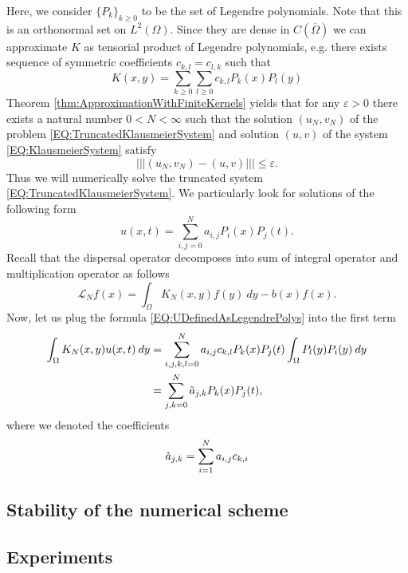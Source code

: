 \documentclass[12pt, a4paper]{article}
\theoremstyle{break}
\theoremstyle{break}
\theoremstyle{break}
\theoremstyle{break}
\theoremstyle{break}
\theoremstyle{break}
\theoremstyle{break}
\begin{document}
Here, we consider $\{ P_k \}_{k \geq 0}$ to be the set of Legendre polynomials. Note that this is an orthonormal set on $L^2(\Omega)$. Since they are dense in $C(\overline{\Omega})$ we can approximate $K$ as tensorial product of Legendre polynomials, e.g. there exists sequence of symmetric coefficients $c_{k,l} = c_{l, k}$ such that
\begin{equation}
    K(x, y) = \sum_{k \geq 0} \sum_{l \geq 0} c_{k, l} P_k(x) P_l(y)
\end{equation}
Theorem \ref{thm:ApproximationWithFiniteKernels} yields that for any $\varepsilon > 0$ there exists a natural number $0 < N < \infty$ such that the solution $(u_N, v_N)$ of the problem \eqref{EQ:TruncatedKlausmeierSystem} and solution $(u, v)$ of the system \eqref{EQ:KlausmeierSystem} satisfy
\begin{equation}
    |||(u_N, v_N) - (u, v)||| \leq \varepsilon.
\end{equation}
Thus we will numerically solve the truncated system \eqref{EQ:TruncatedKlausmeierSystem}. We particularly look for solutions of the following form
\begin{equation}
    \label{EQ:UDefinedAsLegendrePolys}
    u(x, t) = \sum_{i, j = 0}^N a_{i, j} P_i(x) P_j(t).
\end{equation}
Recall that the dispersal operator decomposes into sum of integral operator and multiplication operator as follows
\begin{equation}
    \mathcal{L}_N f(x) = \int_\Omega K_N(x,y) f(y)\:dy - b(x) f(x).
\end{equation}
Now, let us plug the formula \eqref{EQ:UDefinedAsLegendrePolys} into the first term
\begin{align*}
    \int_\Omega K_N(x,y) u(x,t) \:dy
    &= \sum_{i, j, k, l = 0}^N a_{i, j} c_{k, l} P_k(x) P_j(t) \int_\Omega P_l(y) P_i(y) \:dy \\
    &= \sum_{j, k = 0}^N \Tilde{a}_{j, k} P_k(x) P_j(t),
\end{align*}
where we denoted the coefficients
\begin{equation*}
    \Tilde{a}_{j ,k} = \sum_{i=1}^N a_{i, j} c_{k, i}
\end{equation*}
\subsection{Stability of the numerical scheme}

\subsection{Experiments}

\newpage





\end{document}
